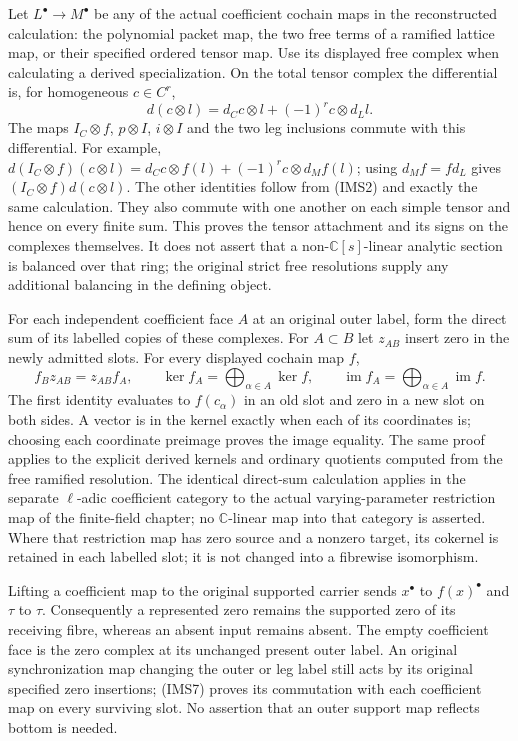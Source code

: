 \documentclass[11pt,a4paper]{article}
\theoremstyle{definition}
\begin{document}
Let \(L^\bullet\to M^\bullet\) be any of the actual coefficient
cochain maps in the reconstructed calculation: the polynomial packet
map, the two free terms of a ramified lattice map, or their specified
ordered tensor map.  Use its displayed free complex when calculating
a derived specialization.  On the total tensor complex the
differential is, for homogeneous \(c\in C^r\),
\[
 d(c\otimes l)=d_Cc\otimes l+(-1)^r c\otimes d_Ll .
 \tag{IMS6}
\]
The maps \(I_C\otimes f\), \(p\otimes I\), \(i\otimes I\) and the two
leg inclusions commute with this differential.  For example,
\(d(I_C\otimes f)(c\otimes l)
=d_Cc\otimes f(l)+(-1)^r c\otimes d_Mf(l)\);
using \(d_Mf=fd_L\) gives \((I_C\otimes f)d(c\otimes l)\).
The other identities follow from (IMS2) and exactly the same
calculation.  They also commute with one another on each simple
tensor and hence on every finite sum.  This proves the tensor
attachment and its signs on the complexes themselves.  It does not
assert that a non-\(\mathbb C[s]\)-linear analytic section is balanced
over that ring; the original strict free resolutions supply any
additional balancing in the defining object.

For each independent coefficient face \(A\) at an original outer
label, form the direct sum of its labelled copies of these complexes.
For \(A\subset B\) let \(z_{AB}\) insert zero in the newly admitted
slots.  For every displayed cochain map \(f\),
\[
 f_B z_{AB}=z_{AB}f_A,\qquad
 \ker f_A=\bigoplus_{\alpha\in A}\ker f,\qquad
 \operatorname{im}f_A=\bigoplus_{\alpha\in A}\operatorname{im}f .
 \tag{IMS7}
\]
The first identity evaluates to \(f(c_\alpha)\) in an old slot and
zero in a new slot on both sides.  A vector is in the kernel exactly
when each of its coordinates is; choosing each coordinate preimage
proves the image equality.  The same proof applies to the explicit
derived kernels and ordinary quotients computed from the free
ramified resolution. The identical direct-sum calculation applies in
the separate \(\ell\)-adic coefficient category to the actual
varying-parameter restriction map of the finite-field chapter;
no \(\mathbb C\)-linear map into that category is asserted.
Where that restriction
map has zero source and a nonzero target, its cokernel is retained in
each labelled slot; it is not changed into a fibrewise isomorphism.

Lifting a coefficient map to the original supported carrier sends
\(x^\bullet\) to \(f(x)^\bullet\) and \(\tau\) to \(\tau\).
Consequently a represented zero remains the supported zero of its
receiving fibre, whereas an absent input remains absent.  The empty
coefficient face is the zero complex at its unchanged present outer
label.  An original synchronization map changing the outer or leg
label still acts by its original specified zero insertions; (IMS7)
proves its commutation with each coefficient map on every surviving
slot.  No assertion that an outer support map reflects bottom is
needed.
\end{document}
